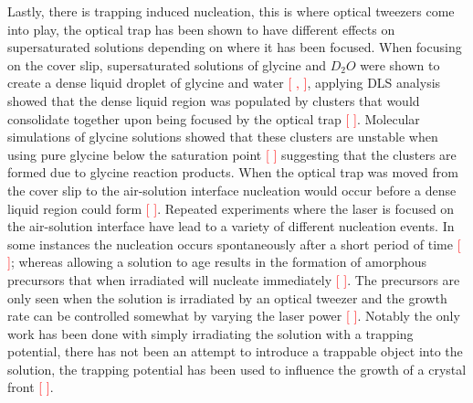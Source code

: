 \documentclass[a4paper,oneside,11pt]{book}
\begin{document}
Lastly, there is trapping induced nucleation, this is where optical tweezers come into play, the optical trap has been shown to have different effects on supersaturated solutions depending on where it has been focused. When focusing on the cover slip, supersaturated solutions of glycine and $D_2O$ were shown to create a dense liquid droplet of glycine and water \textcolor{red}{[ , ]}, applying DLS analysis showed that the dense liquid region was populated by clusters that would consolidate together upon being focused by the optical trap \textcolor{red}{[ ]}. Molecular simulations of glycine solutions showed that these clusters are unstable when using pure glycine below the saturation point \textcolor{red}{[ ]} suggesting that the clusters are formed due to glycine reaction products. When the optical trap was moved from the cover slip to the air-solution interface nucleation would occur before a dense liquid region could form \textcolor{red}{[ ]}. Repeated experiments where the laser is focused on the air-solution interface have lead to a variety of different nucleation events. In some instances the nucleation occurs spontaneously after a short period of time \textcolor{red}{[ ]}; whereas allowing a solution to age results in the formation of amorphous precursors that when irradiated will nucleate immediately \textcolor{red}{[ ]}. The precursors are only seen when the solution is irradiated by an optical tweezer and the growth rate can be controlled somewhat by varying the laser power \textcolor{red}{[ ]}. Notably the only work has been done with simply irradiating the solution with a trapping potential, there has not been an attempt to introduce a trappable object into the solution, the trapping potential has been used to influence the growth of a crystal front \textcolor{red}{[ ]}.
\end{document}
